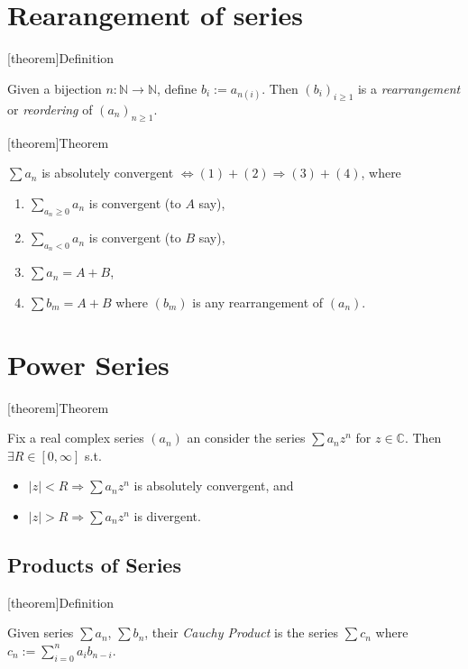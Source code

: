\documentclass[12pt]{report}
\theoremstyle{definition}
\begin{document}
\section{Rearangement of series}
[theorem]{Definition}
\begin{Rearrangement of a sequence}
    Given a bijection $n: \mathbb{N} \rightarrow \mathbb{N}$, define $b_i := a_{n(i)}$. 
    Then ${(b_i)}_{i \ge 1}$ is a \emph{rearrangement} or \emph{reordering} of ${(a_n)}_{n \ge 1}$.
\end{Rearrangement of a sequence}

[theorem]{Theorem}
\begin{convergence of reordered series}
    $\sum a_n$ is absolutely convergent $\iff (1) + (2) \Rightarrow (3) + (4)$, where
    \begin{enumerate}
        \item $\sum_{a_n \ge 0}^{} a_n$ is convergent (to $A$ say),
        \item $\sum_{a_n < 0}^{} a_n$ is convergent (to $B$ say),
        \item $\sum a_n = A + B$,
        \item $\sum b_m = A + B$ where $(b_m)$ is any rearrangement of $(a_n)$.
    \end{enumerate}
\end{convergence of reordered series}

\section{Power Series}
[theorem]{Theorem}
\begin{radius of convergent}
    Fix a real complex series $(a_n)$ an consider the series $\sum a_n z^{n}$ for $z \in \mathbb{C}$.
    Then $\exists R \in [0, \infty]$ s.t. 
    \begin{itemize}
        \item $|z| < R \Rightarrow \sum a_n z^{n}$ is absolutely convergent, and
        \item $|z| > R \Rightarrow \sum a_n z^{n}$ is divergent.
    \end{itemize}
\end{radius of convergent}

\subsection{Products of Series}
[theorem]{Definition}
\begin{cauchy product}
    Given series $\sum a_n$, $\sum b_n$, their \emph{Cauchy Product} is the series $\sum c_n$
    where $c_n := \sum_{i=0}^{n} a_i b_{n-i}$.
\end{cauchy product}
\end{document}
